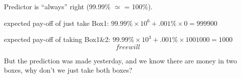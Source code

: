 \documentclass[a4paper, 11pt, twoside]{article}
\begin{document}
Predictor is ``always'' right (99.99\% $\simeq$ = 100\%).

expected pay-off of just take Box1: $99.99\%\times 10^6 + .001\%\times 0=999900$

expected pay-off of taking Box1\&2: $99.99\%\times 10^3 + .001\%\times 1001000=1000$\\

\[free will\]

But the prediction was made yesterday, and we know there are money in two boxes, why don't we just take both boxes?
\end{document}
